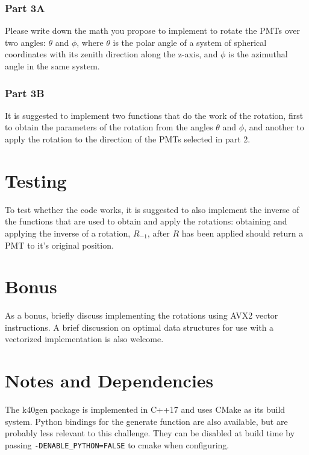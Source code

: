 \documentclass{article}
\begin{document}
\subsubsection{Part 3A}

Please write down the math you propose to implement to rotate the PMTs
over two angles: $\theta$ and $\phi$, where $\theta$ is the polar
angle of a system of spherical coordinates with its zenith direction
along the z-axis, and $\phi$ is the azimuthal angle in the same
system.

\subsubsection{Part 3B}

It is suggested to implement two functions that do the work of the
rotation, first to obtain the parameters of the rotation from the
angles $\theta$ and $\phi$, and another to apply the rotation to the
direction of the PMTs selected in part 2.

\section{Testing}

To test whether the code works, it is suggested to also implement the
inverse of the functions that are used to obtain and apply the
rotations: obtaining and applying the inverse of a rotation,
$R_{-1}$, after $R$ has been applied should return a PMT to it's
original position.

\section{Bonus}

As a bonus, briefly discuss implementing the rotations using AVX2
vector instructions. A brief discussion on optimal data structures for
use with a vectorized implementation is also welcome.

\section{Notes and Dependencies}

The k40gen package is implemented in C++17 and uses CMake as its build
system. Python bindings for the generate function are also available,
but are probably less relevant to this challenge. They can be disabled
at build time by passing \verb|-DENABLE_PYTHON=FALSE| to cmake when
configuring.
\end{document}
